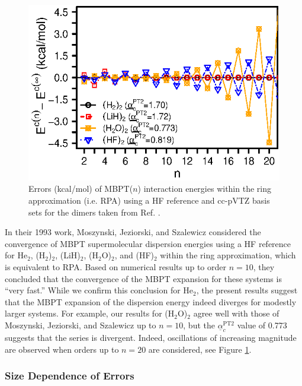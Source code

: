 \documentclass[journal=jctcce,manuscript=article]{achemso}
\begin{document}
\begin{figure}[hbpt]
  \centering
  \includegraphics{expand_hf.eps}
  \caption{Errors (kcal/mol) of MBPT($n$) interaction energies within
    the ring approximation (i.e. RPA) using a HF reference and cc-pVTZ
    basis sets for the dimers taken from Ref. .}
  \label{fig:hf_expand}
\end{figure}

In their 1993 work\cite{doi:10.1002/qua.560450502}, Moszynski,
Jeziorski, and Szalewicz considered the convergence of MBPT supermolecular
dispersion energies using a HF reference for
He$_2$, (H$_2$)$_2$, (LiH)$_2$, (H$_2$O)$_2$, and (HF)$_2$ within the
ring approximation, which is equivalent to RPA. Based on
numerical results up to order $n=10$, they concluded that the
convergence of the MBPT expansion for these systems is ``very fast.'' 
While we confirm this conclusion for He$_2$, the present results suggest
that the MBPT expansion of the dispersion energy indeed diverges for
modestly larger systems. For example, our results for (H$_2$O)$_2$ agree
well 
with those of Moszynski, Jeziorski, and Szalewicz up to $n=10$, but the
$\underline{\alpha}_c^{\text{PT2}}$ value of 0.773 suggests that the
series is divergent. Indeed, oscillations of increasing magnitude are
observed when orders up to
$n=20$ are considered, see Figure \ref{fig:hf_expand}. 

\subsubsection{Size Dependence of Errors}
\label{subsub:size_dependence}
\end{document}
